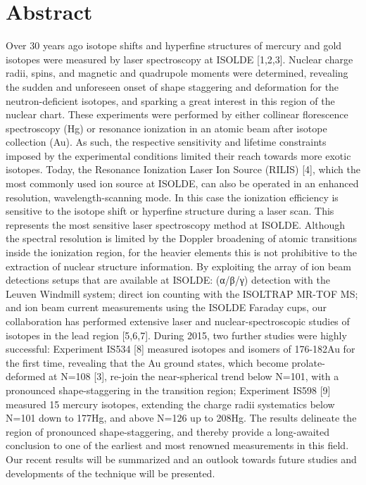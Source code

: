 \section{Abstract} 

Over 30 years ago isotope shifts and hyperfine structures of mercury and gold isotopes were measured by laser spectroscopy at ISOLDE [1,2,3]. Nuclear charge radii, spins, and magnetic and quadrupole moments were determined, revealing the sudden and unforeseen onset of shape staggering and deformation for the neutron-deficient isotopes, and sparking a great interest in this region of the nuclear chart.  These experiments were performed by either collinear florescence spectroscopy (Hg) or resonance ionization in an atomic beam after isotope collection (Au).  As such, the respective sensitivity and lifetime constraints imposed by the experimental conditions limited their reach towards more exotic isotopes.  Today, the Resonance Ionization Laser Ion Source (RILIS) [4], which the most commonly used ion source at ISOLDE, can also be operated in an enhanced resolution, wavelength-scanning mode. In this case the ionization efficiency is sensitive to the isotope shift or hyperfine structure during a laser scan.  This represents the most sensitive laser spectroscopy method at ISOLDE. Although the spectral resolution is limited by the Doppler broadening of atomic transitions inside the ionization region, for the heavier elements this is not prohibitive to the extraction of nuclear structure information.  By exploiting the array of ion beam detections setups that are available at ISOLDE: (α/β/γ) detection with the Leuven Windmill system; direct ion counting with the ISOLTRAP MR-TOF MS; and ion beam current measurements using the ISOLDE Faraday cups, our collaboration has performed extensive laser and nuclear-spectroscopic studies of isotopes in the lead region [5,6,7].  During 2015, two further studies were highly successful: Experiment IS534 [8] measured isotopes and isomers of 176-182Au for the first time, revealing that the Au ground states, which become prolate-deformed at N=108 [3], re-join the near-spherical trend below N=101, with a pronounced shape-staggering in the transition region; Experiment IS598 [9] measured 15 mercury isotopes, extending the charge radii systematics below N=101 down to 177Hg, and above N=126 up to 208Hg.  The results delineate the region of pronounced shape-staggering, and thereby provide a long-awaited conclusion to one of the earliest and most renowned measurements in this field.   Our recent results will be summarized and an outlook towards future studies and developments of the technique will be presented.
